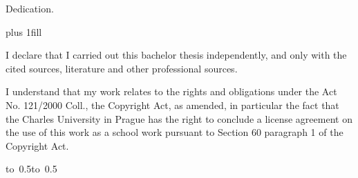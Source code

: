 \documentclass[12pt,a4paper]{report}
\let\openright=\clearpage
\theoremstyle{plain}
\theoremstyle{definition}
\theoremstyle{remark}
\numberwithin{equation}{section}
\begin{document}
\newpage



\openright

\noindent
Dedication.

\newpage


\vglue 0pt plus 1fill

\noindent
I declare that I carried out this bachelor thesis independently, and only with the cited
sources, literature and other professional sources.

\medskip\noindent
I understand that my work relates to the rights and obligations under the Act No.
121/2000 Coll., the Copyright Act, as amended, in particular the fact that the Charles
University in Prague has the right to conclude a license agreement on the use of this
work as a school work pursuant to Section 60 paragraph 1 of the Copyright Act.

\vspace{10mm}

\hbox{\hbox to 0.5\hbox to 0.5}

\vspace{20mm}
\newpage

\end{document}
